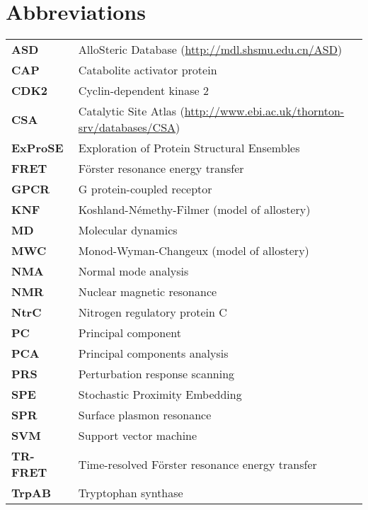 \section*{Abbreviations}

\begin{tabular}{ >{\bfseries}l l }
ASD      &  AlloSteric Database (\url{http://mdl.shsmu.edu.cn/ASD}) \\
CAP      &  Catabolite activator protein \\
CDK2     &  Cyclin-dependent kinase 2 \\
CSA      &  Catalytic Site Atlas (\url{http://www.ebi.ac.uk/thornton-srv/databases/CSA}) \\
ExProSE  &  Exploration of Protein Structural Ensembles \\
FRET     &  F\"{o}rster resonance energy transfer \\
GPCR     &  G protein-coupled receptor \\
KNF      &  Koshland-N\'{e}methy-Filmer (model of allostery) \\
MD       &  Molecular dynamics \\
MWC      &  Monod-Wyman-Changeux (model of allostery) \\
NMA      &  Normal mode analysis \\
NMR      &  Nuclear magnetic resonance \\
NtrC     &  Nitrogen regulatory protein C \\
PC       &  Principal component \\
PCA      &  Principal components analysis \\
PRS      &  Perturbation response scanning \\
SPE      &  Stochastic Proximity Embedding \\
SPR      &  Surface plasmon resonance \\
SVM      &  Support vector machine \\
TR-FRET  &  Time-resolved F\"{o}rster resonance energy transfer \\
TrpAB    &  Tryptophan synthase \\
\end{tabular}
